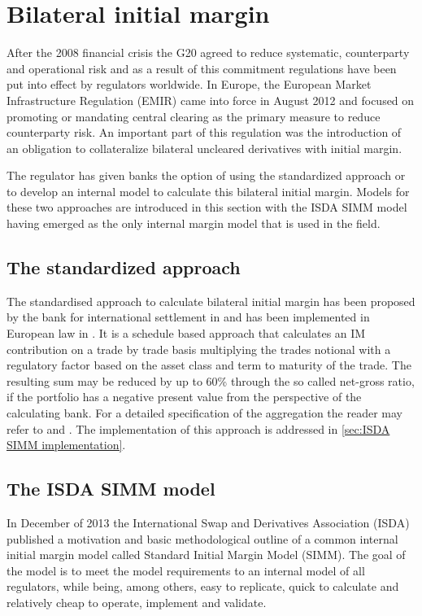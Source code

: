 \documentclass[../Thesis_AHoecherl.tex]{subfiles}
\begin{document}
    \section{Bilateral initial margin}\label{Bilateral initial margin}
    
    After the 2008 financial crisis the G20 agreed to reduce systematic, counterparty and operational risk and as a result of this commitment regulations have been put into effect by regulators worldwide. In Europe, the European Market Infrastructure Regulation (EMIR) came into force in August 2012 and focused on promoting or mandating central clearing as the primary measure to reduce counterparty risk. An important part of this regulation was the introduction of an obligation to collateralize bilateral uncleared derivatives with initial margin.

    The regulator has given banks the option of using the standardized approach or to develop an internal model to calculate this bilateral initial margin. Models for these two approaches are introduced in this section with the \gls{ISDA SIMM} model having emerged as the only internal margin model that is used in the field.

    \subsection{The standardized approach}\label{The standard approach}

    The standardised approach to calculate bilateral initial margin has been proposed by the bank for international settlement in \cite[Requirement 3.5 and 3.6]{BCBS_MarginRequirements} and has been implemented in European law in \cite{OTC_Margin_EU_Regulation}. It is a schedule based approach that calculates an \gls{IM} contribution on a trade by trade basis multiplying the trades notional with a regulatory factor based on the asset class and term to maturity of the trade.
    The resulting sum may be reduced by up to 60\% through the so called net-gross ratio, if the portfolio has a negative present value from the perspective of the calculating bank.
    For a detailed specification of the aggregation the reader may refer to \cite{BCBS_MarginRequirements} and \cite{OTC_Margin_EU_Regulation}. The implementation of this approach is addressed in \ref{sec:ISDA SIMM implementation}.
    
    \subsection{The ISDA SIMM model}\label{sec:The ISDA-SIMM model}
    In December of 2013 the International Swap and Derivatives Association (ISDA) published a motivation and basic methodological outline of a common internal initial margin model called Standard Initial Margin Model (SIMM\texttrademark)\cite{ISDADec2013}. The goal of the model is to meet the model requirements to an internal model of all regulators, while being, among others, easy to replicate, quick to calculate and relatively cheap to operate, implement and validate.
\end{document}
